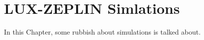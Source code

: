 \chapter{LUX-ZEPLIN Simlations}
\par
In this Chapter, some rubbish about simulations is talked about.





